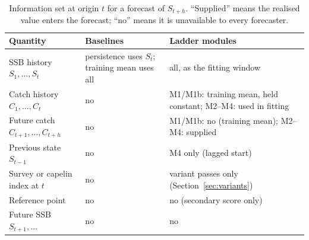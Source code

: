 \begin{table}[!htb]
\centering\small
\caption{Information set at origin $t$ for a forecast of $S_{t+h}$. ``Supplied'' means the realised value enters the forecast; ``no'' means it is unavailable to every forecaster.}
\label{tab:infoset}
\begin{tabularx}{\textwidth}{@{}>{\raggedright\arraybackslash}p{}LL@{}}
\toprule
Quantity & Baselines & Ladder modules \\
\midrule
SSB history $S_1,\dots,S_t$ & persistence uses $S_t$; training mean uses all & all, as the fitting window \\
Catch history $C_1,\dots,C_t$ & no & M1/M1b: training mean, held constant; M2--M4: used in fitting \\
Future catch $C_{t+1},\dots,C_{t+h}$ & no & M1/M1b: no (training mean); M2--M4: supplied \\
Previous state $S_{t-1}$ & no & M4 only (lagged start) \\
Survey or capelin index at $t$ & no & variant passes only (Section~\ref{sec:variants}) \\
Reference point & no & no (secondary score only) \\
Future SSB $S_{t+1},\dots$ & no & no \\
\bottomrule
\end{tabularx}
\end{table}
